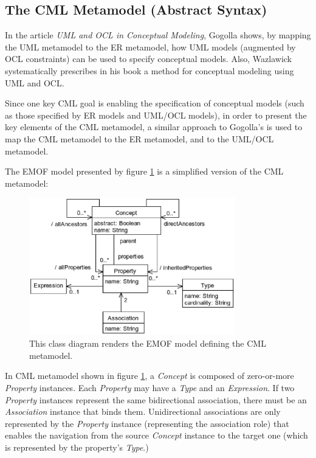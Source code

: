 \subsection{The CML Metamodel (Abstract Syntax)}\label{subsec:metamodel}

In the article \emph{UML and OCL in Conceptual Modeling}, 
Gogolla \cite{gogolla} shows, by mapping the UML \cite{uml} metamodel to the ER \cite{er} metamodel,
how UML models (augmented by OCL \cite{ocl} constraints) can be used to specify conceptual models.
Also, Wazlawick \cite{wazlawick} systematically prescribes in his book a method for conceptual modeling using UML and OCL. 

Since one key CML goal is enabling the specification of conceptual models
(such as those specified by ER models and UML/OCL models),
in order to present the key elements of the CML metamodel,
a similar approach to Gogolla's is used to map the CML metamodel to the ER metamodel,
and to the UML/OCL metamodel.

\pagebreak[4]

The EMOF \cite{mof} model presented by figure \ref{fig:metamodel} is a simplified version of the CML metamodel:

\begin{figure}
\centering
\includegraphics[width=0.8\textwidth]{language/diagram-metamodel}
\caption{This class diagram renders the EMOF \cite{mof} model defining the CML metamodel.}
\label{fig:metamodel}
\end{figure}

In CML metamodel shown in figure \ref{fig:metamodel},
a \emph{Concept} is composed of zero-or-more \emph{Property} instances.
Each \emph{Property} may have a \emph{Type} and an \emph{Expression}.
If two \emph{Property} instances represent the same bidirectional association,
there must be an \emph{Association} instance that binds them.
Unidirectional associations are only represented by the \emph{Property} instance (representing the association role)
that enables the navigation from the source \emph{Concept} instance to the target one (which is represented by the property's \emph{Type}.)

